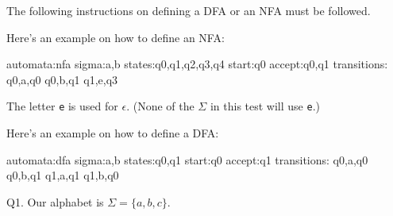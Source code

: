 



\renewcommand\TITLE{Test 1 Part A}

\renewcommand\AUTHOR{David Campbell}
\renewcommand\EMAIL{djcampbell2@cougars.ccis.edu}
\newcommand\tf{T or F or M: }


\topmatter

The following instructions on defining a DFA or an NFA
must be followed.

Here's an example on how to define an NFA:
\begin{console}
automata:nfa
sigma:a,b
states:q0,q1,q2,q3,q4
start:q0
accept:q0,q1
transitions:
q0,a,q0
q0,b,q1
q1,e,q3
\end{console}
The letter \verb!e! is used for $\epsilon$.
(None of the $\Sigma$ in this test will use \verb!e!.)

Here's an example on how to define a DFA:
\begin{console}
automata:dfa
sigma:a,b
states:q0,q1
start:q0
accept:q1
transitions:
q0,a,q0
q0,b,q1
q1,a,q1
q1,b,q0
\end{console}




\newpage

Q1. Our alphabet is $\Sigma = \{a, b, c\}$.

